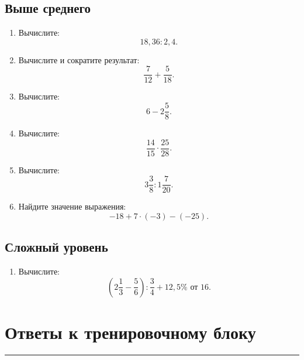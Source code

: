 \documentclass[a4paper,12pt]{article}
\newcommand{\sectionline}{%
    \vspace{-0.25em}
    {\color{accent}\rule{\linewidth}{0.7pt}}
    \vspace{0.3em}
}
\begin{document}
\subsection*{\color{accent}Выше среднего}

\begin{enumerate}[resume]
    \item Вычислите:
    \[
    18{,}36:2{,}4.
    \]

    \item Вычислите и сократите результат:
    \[
    \frac{7}{12}+\frac{5}{18}.
    \]

    \item Вычислите:
    \[
    6-2\frac58.
    \]

    \item Вычислите:
    \[
    \frac{14}{15}\cdot\frac{25}{28}.
    \]

    \item Вычислите:
    \[
    3\frac38:1\frac7{20}.
    \]

    \item Найдите значение выражения:
    \[
    -18+7\cdot(-3)-(-25).
    \]
\end{enumerate}

\subsection*{\color{accent}Сложный уровень}

\begin{enumerate}[resume]
    \item Вычислите:
    \[
    \left(
        2\frac13-\frac56
    \right)
    :
    \frac34
    +
    12{,}5\%\text{ от }16.
    \]
\end{enumerate}


\clearpage
\section*{\color{darkaccent}Ответы к тренировочному блоку}
\sectionline

\renewcommand{\arraystretch}{1.35}
\end{document}
